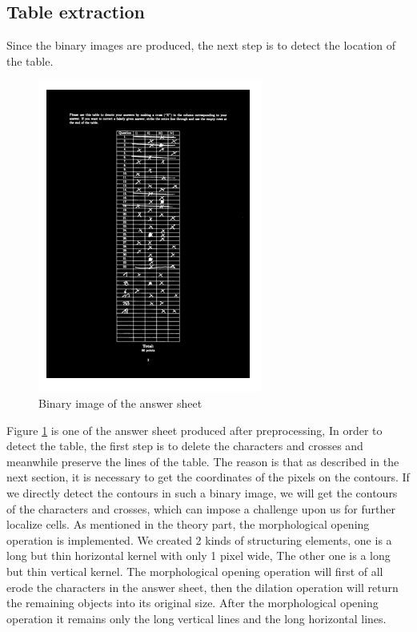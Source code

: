 \documentclass[a4paper,twoside]{article}
\begin{document}
\subsection{Table extraction}
Since the binary images are produced, the next step is to detect the location of the table. 
\begin{figure}[!h]
  \centering
  \includegraphics[width=\columnwidth]{Latex/imgs/binary.PNG}
  \caption{Binary image of the answer sheet}
  \label{fig:answersheet_binary}
 \end{figure}
Figure \ref{fig:answersheet_binary} is one of the answer sheet produced after preprocessing, In order to detect the table, the first step is to delete the characters and crosses and meanwhile preserve the lines of the table. The reason is that as described in the next section, it is necessary to get the coordinates of the pixels on the contours. If we directly detect the contours in such a binary image, we will get the contours of the characters and crosses, which can impose a challenge upon us for further localize cells. As mentioned in the theory part, the morphological opening operation is implemented. We created 2 kinds of structuring elements, one is a long but thin horizontal kernel with only 1 pixel wide, The other one is a long but thin vertical kernel. The morphological opening operation will first of all erode the characters in the answer sheet, then the dilation operation will return the remaining objects into its original size. After the morphological opening operation it remains only the long vertical lines and the long horizontal lines. \\
\end{document}
